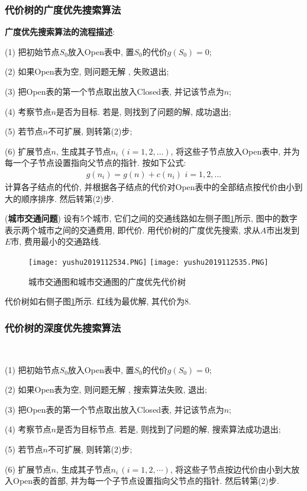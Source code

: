 \subsubsection{代价树的广度优先搜索算法}

\textbf{广度优先搜索算法的流程描述}:

\quad (1) 把初始节点$S_0$放入Open表中, 置$S_0$的代价$g(S_0)=0$;

\quad (2) 如果Open表为空, 则问题无解 , 失败退出;

\quad (3) 把Open表的第一个节点取出放入Closed表, 并记该节点为$n$;

\quad (4) 考察节点$n$是否为目标. 若是, 则找到了问题的解, 成功退出;

\quad (5) 若节点$n$不可扩展, 则转第(2)步;

\quad (6) 扩展节点$n$, 生成其子节点$n_i\,(i=1, 2, …)$, 将这些子节点放入Open表中, 并为每一个子节点设置指向父节点的指针. 按如下公式:
\begin{align}
    g(n_i)=g(n)+c(n_i)\,\,i=1,2,...
\end{align}
计算各子结点的代价, 并根据各子结点的代价对Open表中的全部结点按代价由小到大的顺序排序. 然后转第(2)步.
\begin{example}
    (\textbf{城市交通问题}) 设有5个城市, 它们之间的交通线路如左侧子图\ref{AI32fig2019120234}所示, 图中的数字表示两个城市之间的交通费用, 即代价. 用代价树的广度优先搜索, 求从$A$市出发到$E$市, 费用最小的交通路线.
\end{example}
\begin{result}
\begin{figure}[H]
\centering
\texttt{[image: yushu2019112534.PNG]}
\texttt{[image: yushu2019112535.PNG]}
\caption{城市交通图和城市交通图的广度优先代价树 }
\label{AI32fig2019120234}
\end{figure}
代价树如右侧子图\ref{AI32fig2019120234}所示. 红线为最优解, 其代价为8.
\subsubsection{代价树的深度优先搜索算法}~{}

\quad (1) 把初始节点$S_0$放入Open表中, 置$S_0$的代价$g(S_0)=0$;

\quad (2) 如果Open表为空, 则问题无解 , 搜索算法失败, 退出;

\quad (3) 把Open表的第一个节点取出放入Closed表, 并记该节点为$n$;

\quad (4) 考察节点$n$是否为目标节点. 若是, 则找到了问题的解, 搜索算法成功退出;

\quad (5) 若节点$n$不可扩展, 则转第(2)步;

\quad (6) 扩展节点$n$, 生成其子节点$n_i\,(i=1, 2,\cdots)$, 将这些子节点按边代价由小到大放入Open表的首部, 并为每一个子节点设置指向父节点的指针. 然后转第(2)步.
\end{result}

